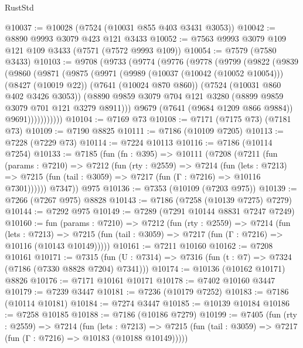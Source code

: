 \begin{lexlean}{RustStd}
\begin{coremodule}
{\begin{coremodule}
{{{{{{{{{{{{{{{{{{{{{{{{{{{{{{{{@10037 := @10028 (@7524 (@10031 @855 @403 @3431 @3053))
@10042 := @8890 @9993 @3079 @423 @121 @3433
@10052 := @7563 @9993 @3079 @109 @121 @109 @3433 (@7571 (@7572 @9993 @109))
@10054 := @7579 (@7580 @3433)
@10103 := @9708
    (@9733
      (@9774
        (@9776
          (@9778
            (@9799
              (@9822
                (@9839
                  (@9860
                    (@9871
                      (@9875
                        (@9971
                          (@9989
                            (@10037 (@10042 (@10052 @10054)))
                            (@8427 (@10019 @22))
                            (@7641 (@10024 @870 @860))
                            (@7524 (@10031 @860 @402 @3426 @3053))
                            (@8890
                              @9859
                              @3079
                              @704
                              @121
                              @3280
                              (@8899 @9859 @3079 @701 @121 @3279 @8911)))
                          @9679
                          (@7641 (@9684 @1209 @866 @9884))
                          @9691)))))))))))
@10104 := @7169 @73
@10108 := @7171 (@7175 @73) (@7181 @73)
@10109 := @7190 @8825
@10111 := @7186 (@10109 @7205)
@10113 := @7228 (@7229 @73)
@10114 := @7224 @10113
@10116 := @7186 (@10114 @7254)
@10133 := @7185
    (fun (fn : @395) =>
    @10111
      (@7208
        (@7211
          (fun (params : @7210) =>
          @7212
            (fun (rty : @2559) =>
            @7214
              (fun (lets : @7213) =>
              @7215 (fun (tail : @3059) => @7217 (fun (Γ : @7216) => @10116 @7301))))))
        @7347))
    @975
@10136 := @7353 (@10109 (@7203 @975))
@10139 := @7266 (@7267 @975) @8828
@10143 := @7186 (@7258 (@10139 @7275) @7279)
@10144 := @7292 @975
@10149 := @7289 (@7291 @10144 @8831 @7247 @7249)
@10160 := fun (params : @7210) =>
  @7212
    (fun (rty : @2559) =>
    @7214
      (fun (lets : @7213) =>
      @7215 (fun (tail : @3059) => @7217 (fun (Γ : @7216) => @10116 (@10143 @10149)))))
@10161 := @7211 @10160
@10162 := @7208 @10161
@10171 := @7315 (fun (U : @7314) => @7316 (fun (t : @7) => @7324 (@7186 (@7330 @8828 @7204) @7341)))
@10174 := @10136 (@10162 @10171) @8826
@10176 := @7171 @10161 @10171
@10178 := @7402 @10160 @3447
@10179 := @7239 @3447
@10181 := @7236 (@10179 @7252)
@10183 := @7186 (@10114 @10181)
@10184 := @7274 @3447
@10185 := @10139 @10184
@10186 := @7258 @10185
@10188 := @7186 (@10186 @7279)
@10199 := @7405
    (fun (rty : @2559) =>
    @7214
      (fun (lets : @7213) =>
      @7215 (fun (tail : @3059) => @7217 (fun (Γ : @7216) => @10183 (@10188 @10149)))))
}}}}}}}}}}}}}}}}}}}}}}}}}}}}}}}}
\end{coremodule}}
\end{coremodule}
\end{lexlean}
